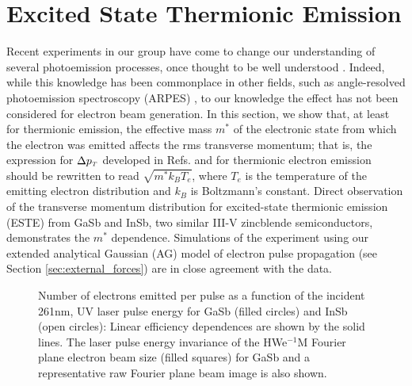 
\section{Excited State Thermionic Emission} \label{sec:este}

Recent experiments in our group have come to change our understanding of several photoemission processes, once thought to be well understood \cite{berger_excited_2012}.
Indeed, while this knowledge has been commonplace in other fields, such as angle-resolved photoemission spectroscopy (ARPES) \cite{himpsel_angle-resolved_1983}, to our knowledge the effect has not been considered for electron beam generation.
In this section, we show that, at least for thermionic emission, the effective mass $m^*$ of the electronic state from which the electron was emitted affects the rms transverse momentum; that is, the expression for $\Delta p_{{\scriptscriptstyle T}}$ developed in Refs. \cite{dowell_quantum_2009} and \cite{jensen_emittance_2010} for thermionic electron emission should be rewritten to read $\sqrt{m^* k_B T_e}$, where $T_e$ is the temperature of the emitting electron distribution and $k_B$ is Boltzmann's constant.
Direct observation of the transverse momentum distribution for excited-state thermionic emission (ESTE) from GaSb and InSb, two similar III-V zincblende semiconductors, demonstrates the $m^*$ dependence.
Simulations of the experiment using our extended analytical Gaussian (AG) model of electron pulse propagation (see Section \ref{sec:external_forces}) are in close agreement with the data. 

\begin{figure}
  \centering
  
  \caption[Electron emission vs UV laser pulse energy for GaSb and InSb]{
    Number of electrons emitted per pulse as a function of the incident 261nm, UV laser pulse energy for GaSb (filled circles) and InSb (open circles): Linear efficiency dependences are shown by the solid lines.
    The laser pulse energy invariance of the HWe$^{-1}$M Fourier plane electron beam size (filled squares) for GaSb and a representative raw Fourier plane beam image is also shown.
  }
  \label{fig:este-semicond}
\end{figure}

